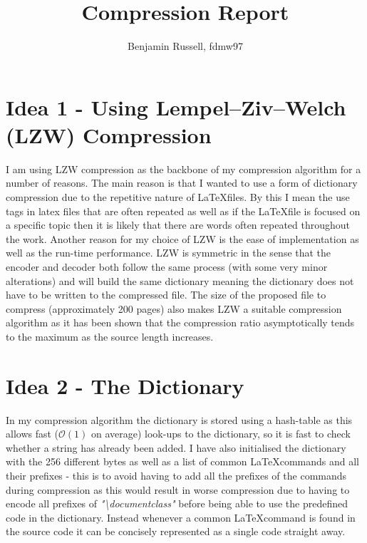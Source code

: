 \documentclass[11pt,a4paper]{article}
\title{Compression Report}
\author{Benjamin Russell, fdmw97}
\begin{document}
\maketitle
\section*{Idea 1 - Using Lempel–Ziv–Welch (LZW) Compression}
I am using LZW compression as the backbone of my compression algorithm for a number of reasons. The main reason is that I wanted to use a form of dictionary compression due to the repetitive nature of \LaTeX files. By this I mean the use tags in latex files that are often repeated as well as if the \LaTeX file is focused on a specific topic then it is likely that there are words often repeated throughout the work. Another reason for my choice of LZW is the ease of implementation as well as the run-time performance. LZW is symmetric in the sense that the encoder and decoder both follow the same process (with some very minor alterations) and will build the same dictionary meaning the dictionary does not have to be written to the compressed file. The size of the proposed file to compress (approximately 200 pages) also makes LZW a suitable compression algorithm as it has been shown that the compression ratio asymptotically tends to the maximum as the source length increases\cite{asym}.
\section*{Idea 2 - The Dictionary}
In my compression algorithm the dictionary is stored using a hash-table as this allows fast ($\mathcal{O}(1)$ on average) look-ups to the dictionary, so it is fast to check whether a string has already been added. I have also initialised the dictionary with the 256 different bytes as well as a list of common \LaTeX commands and all their prefixes - this is to avoid having to add all the prefixes of the commands during compression as this would result in worse compression due to having to encode all prefixes of \emph{"\textbackslash documentclass"} before being able to use the predefined code in the dictionary. Instead whenever a common \LaTeX command is found in the source code it can be concisely represented as a single code straight away.
\end{document}
